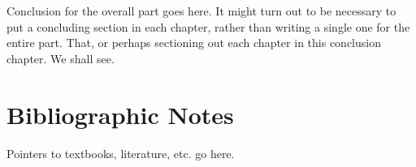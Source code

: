 \label{background:conclusion}
Conclusion for the overall part goes here. It might turn out to be necessary to put a concluding section in each chapter, rather than writing a single one for the entire part. That, or perhaps sectioning out each chapter in this conclusion chapter. We shall see.

\section{Bibliographic Notes}\label{background:conclusion:bibliographicnotes}
Pointers to textbooks, literature, etc. go here.
